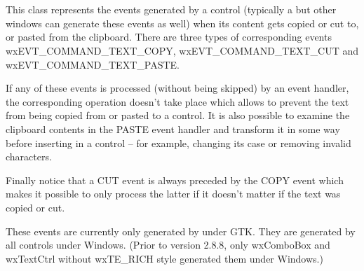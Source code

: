 
\section{}\label{wxclipboardtextevent}

This class represents the events generated by a control (typically a 
 but other windows can generate these events as
well) when its content gets copied or cut to, or pasted from the clipboard.
There are three types of corresponding events wxEVT\_COMMAND\_TEXT\_COPY,
wxEVT\_COMMAND\_TEXT\_CUT and wxEVT\_COMMAND\_TEXT\_PASTE.

If any of these events is processed (without being skipped) by an event
handler, the corresponding operation doesn't take place which allows to prevent
the text from being copied from or pasted to a control. It is also possible to
examine the clipboard contents in the PASTE event handler and transform it in
some way before inserting in a control -- for example, changing its case or
removing invalid characters.

Finally notice that a CUT event is always preceded by the COPY event which
makes it possible to only process the latter if it doesn't matter if the text
was copied or cut.


These events are currently only generated by 
under GTK. They are generated by all controls under Windows. (Prior to version
2.8.8, only wxComboBox and wxTextCtrl without wxTE\_RICH style generated them
under Windows.)



\\
\\




